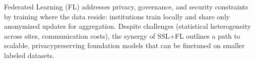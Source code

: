 Federated Learning (FL) \cite{docxRef67,docxRef68} addresses privacy, governance, and security constraints by training where the data reside: institutions train locally and share only anonymized updates for aggregation. Despite challenges (statistical heterogeneity across sites, communication costs), the synergy of SSL+FL outlines a path to scalable, privacy\textendash preserving foundation models that can be fine\textendash tuned on smaller labeled datasets.


